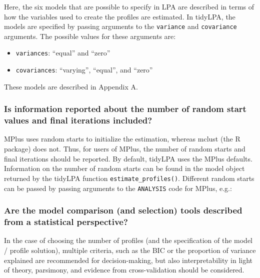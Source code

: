 \documentclass[english,man]{apa6}
\providecommand{\tightlist}{%
  \setlength{\itemsep}{0pt}\setlength{\parskip}{0pt}}
\begin{document}
Here, the six models that are possible to specify in LPA are described in terms of how the variables used to create the profiles are estimated. In tidyLPA, the models are specified by passing
arguments to the \texttt{variance} and \texttt{covariance} arguments. The possible values for
these arguments are:

\begin{itemize}
\tightlist
\item
  \texttt{variances}: \enquote{equal} and \enquote{zero}
\item
  \texttt{covariances}: \enquote{varying}, \enquote{equal}, and \enquote{zero}
\end{itemize}

These models are described in Appendix A.

\hypertarget{is-information-reported-about-the-number-of-random-start-values-and-final-iterations-included}{%
\subsubsection{Is information reported about the number of random start values and final iterations included?}\label{is-information-reported-about-the-number-of-random-start-values-and-final-iterations-included}}

MPlus uses random starts to initialize the estimation, whereas mclust (the R package) does not. Thus, for users of MPlus, the number of random starts and final iterations should be reported. By default, tidyLPA uses the MPlus defaults. Information on the number of random starts can be found in the model object returned by the tidyLPA function \texttt{estimate\_profiles()}. Different random starts can be passed by passing arguments to the \texttt{ANALYSIS} code for MPlus, e.g.:

\hypertarget{are-the-model-comparison-and-selection-tools-described-from-a-statistical-perspective}{%
\subsubsection{Are the model comparison (and selection) tools described from a statistical perspective?}\label{are-the-model-comparison-and-selection-tools-described-from-a-statistical-perspective}}

In the case of choosing the number of profiles (and the specification of the
model / profile solution), multiple criteria, such as the BIC or the proportion
of variance explained are recommended for decision-making, but also
interpretability in light of theory, parsimony, and evidence from
cross-validation should be considered.
\end{document}
